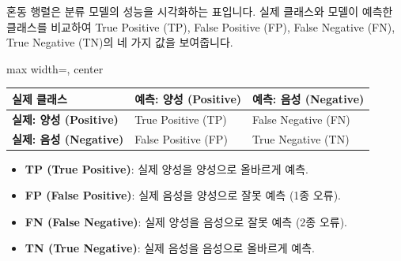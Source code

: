 \documentclass[11pt,a4paper]{article}
\theoremstyle{definition}
\begin{document}
\begin{infobox}[title={혼동 행렬 (Confusion Matrix)}]
혼동 행렬은 분류 모델의 성능을 시각화하는 표입니다. 실제 클래스와 모델이 예측한 클래스를 비교하여 True Positive (TP), False Positive (FP), False Negative (FN), True Negative (TN)의 네 가지 값을 보여줍니다.

\begin{adjustbox}{max width=\textwidth, center}
\begin{tabular}{l|ll}
\toprule
\textbf{실제 클래스} & \textbf{예측: 양성 (Positive)} & \textbf{예측: 음성 (Negative)} \\
\midrule
\textbf{실제: 양성 (Positive)} & True Positive (TP) & False Negative (FN) \\
\textbf{실제: 음성 (Negative)} & False Positive (FP) & True Negative (TN) \\
\bottomrule
\end{tabular}
\end{adjustbox}
\begin{itemize}
    \item \textbf{TP (True Positive)}: 실제 양성을 양성으로 올바르게 예측.
    \item \textbf{FP (False Positive)}: 실제 음성을 양성으로 잘못 예측 (1종 오류).
    \item \textbf{FN (False Negative)}: 실제 양성을 음성으로 잘못 예측 (2종 오류).
    \item \textbf{TN (True Negative)}: 실제 음성을 음성으로 올바르게 예측.
\end{itemize}
\end{infobox}
\end{document}
